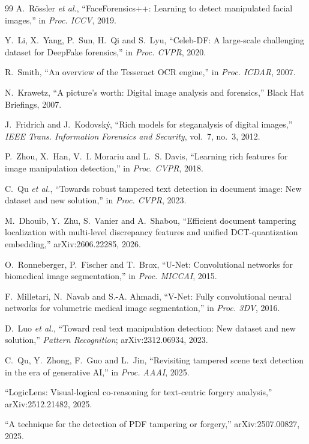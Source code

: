 \documentclass[11pt,a4paper]{article}
\begin{document}
\begin{thebibliography}{99}
A.~R\"ossler \emph{et al.}, ``FaceForensics++: Learning to detect manipulated facial images,'' in
\emph{Proc. ICCV}, 2019.

Y.~Li, X.~Yang, P.~Sun, H.~Qi and S.~Lyu, ``Celeb-DF: A large-scale challenging dataset for
DeepFake forensics,'' in \emph{Proc. CVPR}, 2020.

R.~Smith, ``An overview of the Tesseract OCR engine,'' in \emph{Proc. ICDAR}, 2007.

N.~Krawetz, ``A picture's worth: Digital image analysis and forensics,'' Black Hat Briefings, 2007.

J.~Fridrich and J.~Kodovsk\'y, ``Rich models for steganalysis of digital images,''
\emph{IEEE Trans. Information Forensics and Security}, vol.~7, no.~3, 2012.

P.~Zhou, X.~Han, V.~I. Morariu and L.~S. Davis, ``Learning rich features for image manipulation
detection,'' in \emph{Proc. CVPR}, 2018.

C.~Qu \emph{et al.}, ``Towards robust tampered text detection in document image: New dataset and
new solution,'' in \emph{Proc. CVPR}, 2023.

M.~Dhouib, Y.~Zhu, S.~Vanier and A.~Shabou, ``Efficient document tampering localization with
multi-level discrepancy features and unified DCT-quantization embedding,'' arXiv:2606.22285, 2026.

O.~Ronneberger, P.~Fischer and T.~Brox, ``U-Net: Convolutional networks for biomedical image
segmentation,'' in \emph{Proc. MICCAI}, 2015.

F.~Milletari, N.~Navab and S.-A. Ahmadi, ``V-Net: Fully convolutional neural networks for
volumetric medical image segmentation,'' in \emph{Proc. 3DV}, 2016.

D.~Luo \emph{et al.}, ``Toward real text manipulation detection: New dataset and new solution,''
\emph{Pattern Recognition}; arXiv:2312.06934, 2023.

C.~Qu, Y.~Zhong, F.~Guo and L.~Jin, ``Revisiting tampered scene text detection in the era of
generative AI,'' in \emph{Proc. AAAI}, 2025.

``LogicLens: Visual-logical co-reasoning for text-centric forgery analysis,'' arXiv:2512.21482, 2025.

``A technique for the detection of PDF tampering or forgery,'' arXiv:2507.00827, 2025.


\end{thebibliography}
\end{document}
